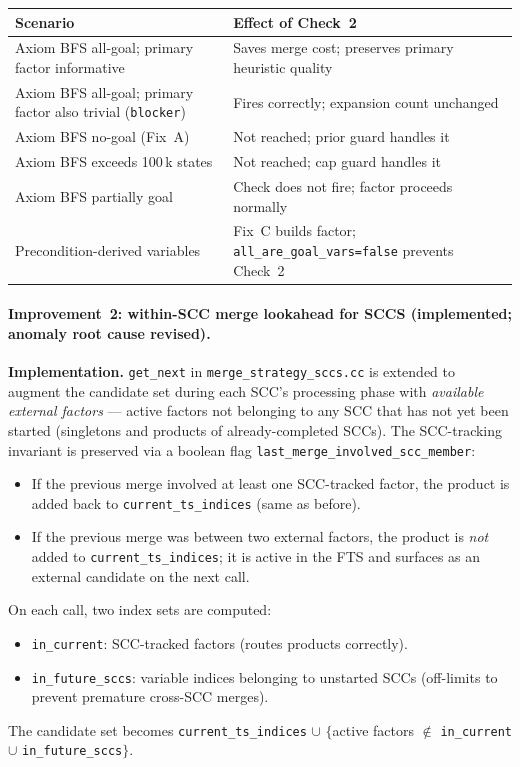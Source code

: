 \documentclass[11pt,a4paper]{article}
\begin{document}
\begin{center}
\small
\begin{tabular}{lp{8cm}}
\toprule
\textbf{Scenario} & \textbf{Effect of Check~2} \\
\midrule
Axiom BFS all-goal; primary factor informative
  & Saves merge cost; preserves primary heuristic quality \\
Axiom BFS all-goal; primary factor also trivial (\texttt{blocker})
  & Fires correctly; expansion count unchanged \\
Axiom BFS no-goal (Fix~A)
  & Not reached; prior guard handles it \\
Axiom BFS exceeds 100\,k states
  & Not reached; cap guard handles it \\
Axiom BFS partially goal
  & Check does not fire; factor proceeds normally \\
Precondition-derived variables
  & Fix~C builds factor; \texttt{all\_are\_goal\_vars=false} prevents Check~2 \\
\bottomrule
\end{tabular}
\end{center}

\paragraph{Improvement~2: within-SCC merge lookahead for SCCS (implemented;
anomaly root cause revised).}

\textbf{Implementation.}
\texttt{get\_next} in \texttt{merge\_strategy\_sccs.cc} is extended to augment
the candidate set during each SCC's processing phase with
\emph{available external factors} --- active factors not belonging to any SCC
that has not yet been started (singletons and products of already-completed
SCCs).  The SCC-tracking invariant is preserved via a boolean flag
\texttt{last\_merge\_involved\_scc\_member}:

\begin{itemize}
  \item If the previous merge involved at least one SCC-tracked factor, the
    product is added back to \texttt{current\_ts\_indices} (same as before).
  \item If the previous merge was between two external factors, the product
    is \emph{not} added to \texttt{current\_ts\_indices}; it is active in the
    FTS and surfaces as an external candidate on the next call.
\end{itemize}

On each call, two index sets are computed:
\begin{itemize}
  \item \texttt{in\_current}: SCC-tracked factors (routes products correctly).
  \item \texttt{in\_future\_sccs}: variable indices belonging to unstarted SCCs
    (off-limits to prevent premature cross-SCC merges).
\end{itemize}
The candidate set becomes \texttt{current\_ts\_indices} $\cup$ $\{$active factors
$\notin$ \texttt{in\_current} $\cup$ \texttt{in\_future\_sccs}$\}$.
\end{document}

